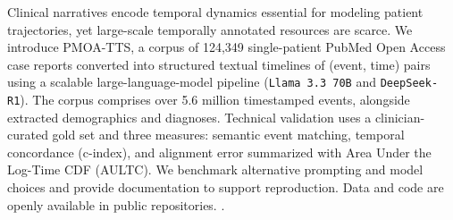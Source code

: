 \ChFiveAbstract
{
Clinical narratives encode temporal dynamics essential for modeling patient trajectories, yet large-scale temporally annotated resources are scarce. We introduce PMOA-TTS, a corpus of 124{,}349 single-patient PubMed Open Access case reports converted into structured textual timelines of (event, time) pairs using a scalable large-language-model pipeline (\texttt{Llama 3.3 70B} and \texttt{DeepSeek-R1}). The corpus comprises over 5.6 million timestamped events, alongside extracted demographics and diagnoses. Technical validation uses a clinician-curated gold set and three measures: semantic event matching, temporal concordance (c-index), and alignment error summarized with Area Under the Log-Time CDF (AULTC). We benchmark alternative prompting and model choices and provide documentation to support reproduction. 
Data and code are openly available in public repositories.
}.





